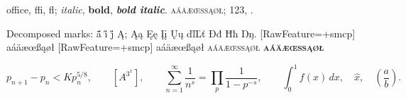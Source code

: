 \documentclass[11pt]{article}
\begin{document}
office, ffi, fl; \emph{italic}, \textbf{bold}, \textbf{\emph{bold italic}}.
\textsc{aáäæœßąøł}; \texteuro{} 123, \texttrademark.

\ifdefined\directlua
  Decomposed marks: ā́̈ i̋ j̋ Ą; Ąą Ęę Įį Ųų ďľĽť Đđ Ħħ Ŋŋ.
  {[RawFeature=+smcp] aáäæœßąøł}
  {[RawFeature=+smcp] aáäæœßąøł}
\else
  {\footnotesize\scshape{}aáäæœßąøł}
  {\bfseries\scshape{}aáäæœßąøł}
\fi

\[ p_{n+1}-p_n<Kp_n^{5/8},\qquad [A^{3^x}],\qquad
   \sum_{n=1}^{\infty}\frac{1}{n^s}=\prod_p\frac{1}{1-p^{-s}},\qquad
   \int_0^1 f(x)\,dx,\quad \widehat{x},\quad \left(\frac{a}{b}\right). \]
\end{document}
